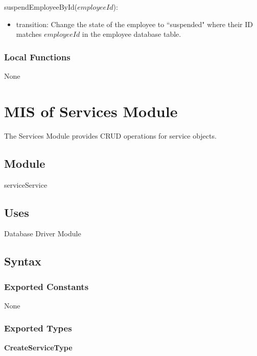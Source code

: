 \documentclass[12pt, titlepage]{article}
\begin{document}
\noindent suspendEmployeeById($employeeId$):
\begin{itemize}
	\item transition: Change the state of the employee to ``suspended" where their ID matches $employeeId$ in
	      the employee database table.
\end{itemize}

\subsubsection{Local Functions}

None

\newpage

\section{MIS of Services Module} \label{mServices}

The Services Module provides CRUD operations for service objects.

\subsection{Module}

serviceService

\subsection{Uses}

Database Driver Module

\subsection{Syntax}

\subsubsection{Exported Constants}

None

\subsubsection{Exported Types}

\textbf{CreateServiceType}
\end{document}
